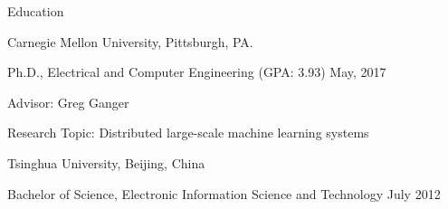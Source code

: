 \documentclass{resume} %
\begin{document}
\begin{rSection}{Education}

\begin{rSubsection}{\hspace{-1em} Carnegie Mellon University, Pittsburgh, PA.}{}{}{}
\vspace{-0.3em}
\item[] \hspace{-2em} Ph.D., Electrical and Computer Engineering (GPA: 3.93) \hfill May, 2017
\item Advisor: Greg Ganger
\item Research Topic: Distributed large-scale machine learning systems
\end{rSubsection}

\begin{rSubsection}{\hspace{-1em} Tsinghua University, Beijing, China}{}{}{}
\item[] \hspace{-2em} Bachelor of Science, Electronic Information Science and Technology \hfill July 2012
\end{rSubsection}

\end{rSection}
\end{document}
